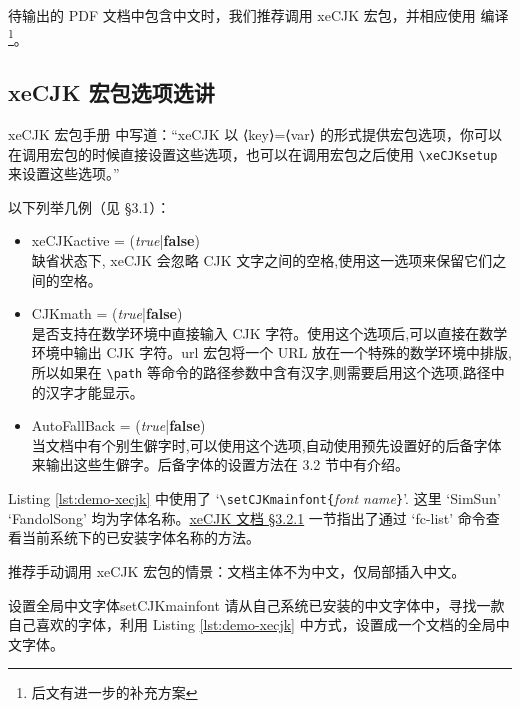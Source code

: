 待输出的 PDF 文档中包含中文时，我们推荐调用 xeCJK 宏包，并相应使用  编译\footnote{后文有进一步的补充方案}。


\subsection{xeCJK 宏包选项选讲}
xeCJK 宏包手册 \cite{xecjk} 中写道：“xeCJK 以 ⟨key⟩=⟨var⟩ 的形式提供宏包选项，你可以在调用宏包的时候直接设置这些选项，也可以在调用宏包之后使用 \verb|\xeCJKsetup| 来设置这些选项。”

以下列举几例（见 \cite{xecjk} \S 3.1）：
\begin{itemize}
\item xeCJKactive = (\textit{true}|\textbf{false}) \\
缺省状态下, xeCJK 会忽略 CJK 文字之间的空格,使用这一选项来保留它们之间的空格。
\item CJKmath = (\textit{true}|\textbf{false}) \\
是否支持在数学环境中直接输入 CJK 字符。使用这个选项后,可以直接在数学环境中输出
CJK 字符。url 宏包将一个 URL 放在一个特殊的数学环境中排版,所以如果在 \verb|\path| 等命令的路径参数中含有汉字,则需要启用这个选项,路径中的汉字才能显示。
\item AutoFallBack = (\textit{true}|\textbf{false}) \\
当文档中有个别生僻字时,可以使用这个选项,自动使用预先设置好的后备字体来输出这些生僻字。后备字体的设置方法在 3.2 节中有介绍。
\end{itemize}

Listing \ref{lst:demo-xecjk} 中使用了 `\verb|\setCJKmainfont{|\textit{font name}\verb|}|'. 这里 `SimSun' `FandolSong' 均为字体名称。\href{http://mirrors.ctan.org/macros/xetex/latex/xecjk/xeCJK.pdf#6}{xeCJK 文档 \S 3.2.1} 一节指出了通过 `fc-list' 命令查看当前系统下的已安装字体名称的方法。

推荐手动调用 xeCJK 宏包的情景：文档主体不为中文，仅局部插入中文。

\begin{Ex}{设置全局中文字体}{setCJKmainfont}
请从自己系统已安装的中文字体中，寻找一款自己喜欢的字体，利用 Listing \ref{lst:demo-xecjk} 中方式，设置成一个文档的全局中文字体。
\end{Ex}